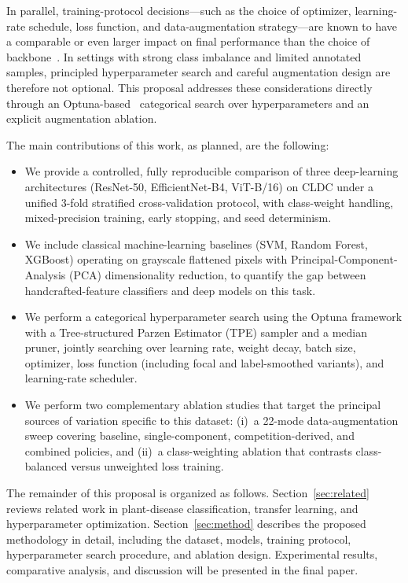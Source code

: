 \documentclass[conference]{IEEEtran}
\begin{document}
In parallel, training-protocol decisions---such as the choice of optimizer, learning-rate schedule, loss function, and data-augmentation strategy---are known to have a comparable or even larger impact on final performance than the choice of backbone~\cite{loshchilov2019adamw,loshchilov2017sgdr,lin2017focal}. In settings with strong class imbalance and limited annotated samples, principled hyperparameter search and careful augmentation design are therefore not optional. This proposal addresses these considerations directly through an Optuna-based~\cite{akiba2019optuna} categorical search over hyperparameters and an explicit augmentation ablation.

The main contributions of this work, as planned, are the following:
\begin{itemize}
  \item We provide a controlled, fully reproducible comparison of three deep-learning architectures (ResNet-50, EfficientNet-B4, ViT-B/16) on CLDC under a unified 3-fold stratified cross-validation protocol, with class-weight handling, mixed-precision training, early stopping, and seed determinism.
  \item We include classical machine-learning baselines (SVM, Random Forest, XGBoost) operating on grayscale flattened pixels with Principal-Component-Analysis (PCA) dimensionality reduction, to quantify the gap between handcrafted-feature classifiers and deep models on this task.
  \item We perform a categorical hyperparameter search using the Optuna framework with a Tree-structured Parzen Estimator (TPE) sampler and a median pruner, jointly searching over learning rate, weight decay, batch size, optimizer, loss function (including focal and label-smoothed variants), and learning-rate scheduler.
  \item We perform two complementary ablation studies that target the principal sources of variation specific to this dataset: (i)~a 22-mode data-augmentation sweep covering baseline, single-component, competition-derived, and combined policies, and (ii)~a class-weighting ablation that contrasts class-balanced versus unweighted loss training.
\end{itemize}

The remainder of this proposal is organized as follows. Section~\ref{sec:related} reviews related work in plant-disease classification, transfer learning, and hyperparameter optimization. Section~\ref{sec:method} describes the proposed methodology in detail, including the dataset, models, training protocol, hyperparameter search procedure, and ablation design. Experimental results, comparative analysis, and discussion will be presented in the final paper.
\end{document}
